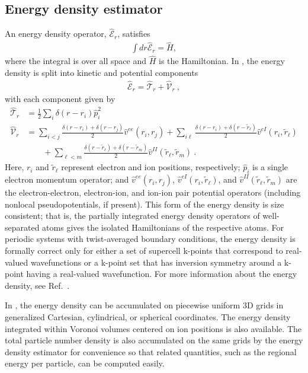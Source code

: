 \subsection{Energy density estimator}
An energy density operator, $\hat{\mathcal{E}}_r$,  satisfies
\begin{align}
  \int dr \hat{\mathcal{E}}_r = \hat{H},
\end{align}
where the integral is over all space and $\hat{H}$ is the Hamiltonian.  In \qmcpack, the energy density is split into kinetic and potential components
\begin{align}
  \hat{\mathcal{E}}_r = \hat{\mathcal{T}}_r + \hat{\mathcal{V}}_r\:, 
\end{align}
with each component given by
\begin{align}
   \hat{\mathcal{T}}_r &=  \frac{1}{2}\sum_i\delta(r-r_i)\hat{p}_i^2 \\  
   \hat{\mathcal{V}}_r &=  \sum_{i<j}\frac{\delta(r-r_i)+\delta(r-r_j)}{2}\hat{v}^{ee}(r_i,r_j)
              + \sum_{i\ell}\frac{\delta(r-r_i)+\delta(r-\tilde{r}_\ell)}{2}\hat{v}^{eI}(r_i,\tilde{r}_\ell) \nonumber\\ 
    &\qquad   + \sum_{\ell< m}\frac{\delta(r-\tilde{r}_\ell)+\delta(r-\tilde{r}_m)}{2}\hat{v}^{II}(\tilde{r}_\ell,\tilde{r}_m)\:.\nonumber
\end{align}
Here, $r_i$ and $\tilde{r}_\ell$ represent electron and ion positions, respectively; $\hat{p}_i$ is a single electron momentum operator; and $\hat{v}^{ee}(r_i,r_j)$, $\hat{v}^{eI}(r_i,\tilde{r}_\ell)$, and $\hat{v}^{II}(\tilde{r}_\ell,\tilde{r}_m)$ are the electron-electron, electron-ion, and ion-ion pair potential operators (including nonlocal pseudopotentials, if present).  This form of the energy density is size consistent; that is, the partially integrated energy density operators of well-separated atoms gives the isolated Hamiltonians of the respective atoms.  For periodic systems with twist-averaged boundary conditions, the energy density is formally correct only for either a set of supercell k-points that correspond to real-valued wavefunctions or a k-point set that has inversion symmetry around a k-point having a real-valued wavefunction.  For more information about the energy density, see Ref.~\cite{Krogel2013}.

In \qmcpack, the energy density can be accumulated on piecewise uniform 3D grids in generalized Cartesian, cylindrical, or spherical coordinates.  The energy density integrated within Voronoi volumes centered on ion positions is also available.  The total particle number density is also accumulated on the same grids by the energy density estimator for convenience so that related quantities, such as the regional energy per particle, can be computed easily.


